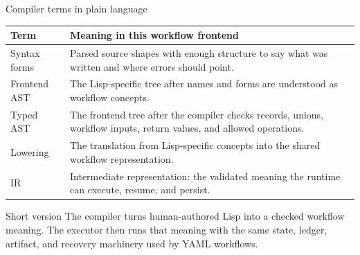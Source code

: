 \documentclass[aspectratio=169]{beamer}
\begin{document}
\begin{frame}{Compiler terms in plain language}
\small
\begin{tabular}{p{}p{}}
\textbf{Term} & \textbf{Meaning in this workflow frontend} \\
\hline
Syntax forms & Parsed source shapes with enough structure to say what was written and where errors should point. \\
Frontend AST & The Lisp-specific tree after names and forms are understood as workflow concepts. \\
Typed AST & The frontend tree after the compiler checks records, unions, workflow inputs, return values, and allowed operations. \\
Lowering & The translation from Lisp-specific concepts into the shared workflow representation. \\
IR & Intermediate representation: the validated meaning the runtime can execute, resume, and persist. \\
\end{tabular}
\vspace{0.8em}
\begin{block}{Short version}
\footnotesize
The compiler turns human-authored Lisp into a checked workflow meaning. The executor then runs that meaning with the same state, ledger, artifact, and recovery machinery used by YAML workflows.
\end{block}
\end{frame}
\end{document}
